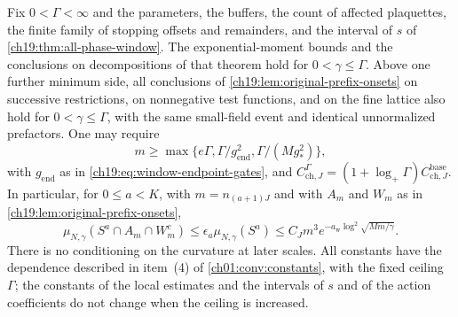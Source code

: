 \begin{lemma}\label{ch19:lem:finite-ceiling-windows-and-prefixes}
Fix $0<\Gamma<\infty$ and the parameters, the buffers, the count of affected plaquettes, the finite family of stopping offsets and remainders, and the interval of $s$ of \cref{ch19:thm:all-phase-window}. The exponential-moment bounds and the conclusions on decompositions of that theorem hold for $0<\gamma\le\Gamma$. Above one further minimum side, all conclusions of \cref{ch19:lem:original-prefix-onsets} on successive restrictions, on nonnegative test functions, and on the fine lattice also hold for $0<\gamma\le\Gamma$, with the same small-field event and identical unnormalized prefactors. One may require
\[
 m\ge\max\{e\Gamma,\Gamma/g_{\mathrm{end}}^2,\Gamma/(Mg_*^2)\},
\]
with $g_{\mathrm{end}}$ as in \eqref{ch19:eq:window-endpoint-gates}, and $C_{\mathrm{ch},J}^{\Gamma}=(1+\log_+\Gamma)C_{\mathrm{ch},J}^{\mathrm{base}}$. In particular, for $0\le a<K$, with $m=n_{(a+1)J}$ and with $A_m$ and $W_m$ as in \cref{ch19:lem:original-prefix-onsets},
\[
 \mu_{N,\gamma}(S^a\cap A_m\cap W_m^c)\le\epsilon_a\mu_{N,\gamma}(S^a)\le C_Jm^3e^{-a_{\mathrm w}\log^2\sqrt{Mm/\gamma}}.
\]
There is no conditioning on the curvature at later scales. All constants have the dependence described in item~(4) of \cref{ch01:conv:constants}, with the fixed ceiling $\Gamma$; the constants of the local estimates and the intervals of $s$ and of the action coefficients do not change when the ceiling is increased.
\end{lemma}

